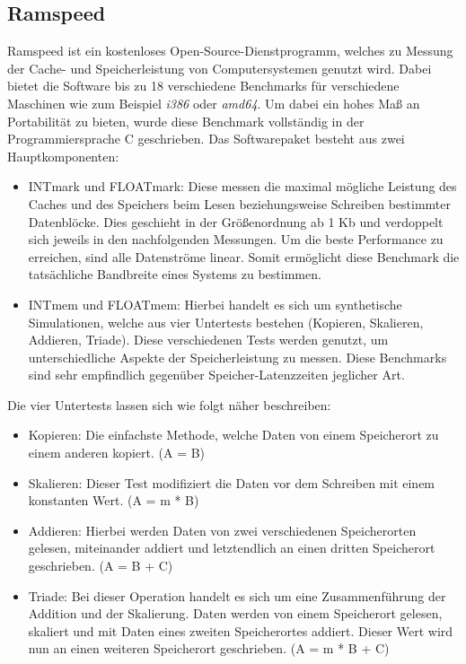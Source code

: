 \subsection{Ramspeed}\label{kap:ramspeed}
Ramspeed ist ein kostenloses Open-Source-Dienstprogramm, welches zu Messung der Cache- und Speicherleistung von Computersystemen genutzt wird.
Dabei bietet die Software bis zu 18 verschiedene
Benchmarks für verschiedene Maschinen wie zum Beispiel \emph{i386} oder \emph{amd64}. Um dabei ein hohes Maß an Portabilität zu bieten, wurde diese Benchmark vollständig in der Programmiersprache
C geschrieben. Das Softwarepaket besteht aus zwei Hauptkomponenten:~\cite{ramspeed}
\begin{itemize}
  \item INTmark und FLOATmark: Diese messen die maximal mögliche Leistung des Caches und des Speichers beim Lesen beziehungsweise Schreiben bestimmter Datenblöcke. Dies geschieht in der Größenordnung ab 1 Kb und
                               verdoppelt sich jeweils in den nachfolgenden Messungen. Um die beste Performance zu erreichen, sind alle Datenströme linear. Somit ermöglicht diese Benchmark die
                               tatsächliche Bandbreite eines Systems zu bestimmen.
  \item INTmem und FLOATmem: Hierbei handelt es sich um synthetische Simulationen, welche aus vier Untertests bestehen (Kopieren, Skalieren, Addieren, Triade). Diese verschiedenen Tests werden
                             genutzt, um unterschiedliche Aspekte der Speicherleistung zu messen. Diese Benchmarks sind sehr empfindlich gegenüber Speicher-Latenzzeiten jeglicher Art.
\end{itemize}

Die vier Untertests lassen sich wie folgt näher beschreiben:
\begin{itemize}
  \item Kopieren: Die einfachste Methode, welche Daten von einem Speicherort zu einem anderen kopiert. (A = B)
  \item Skalieren: Dieser Test modifiziert die Daten vor dem Schreiben mit einem konstanten Wert. (A = m * B)
  \item Addieren: Hierbei werden Daten von zwei verschiedenen Speicherorten gelesen, miteinander addiert und letztendlich an einen dritten Speicherort geschrieben. (A = B + C)
  \item Triade: Bei dieser Operation handelt es sich um eine Zusammenführung der Addition und der Skalierung. Daten werden von einem Speicherort gelesen, skaliert und mit Daten eines zweiten Speicherortes
                addiert. Dieser Wert wird nun an einen weiteren Speicherort geschrieben. (A = m * B + C)
\end{itemize}

